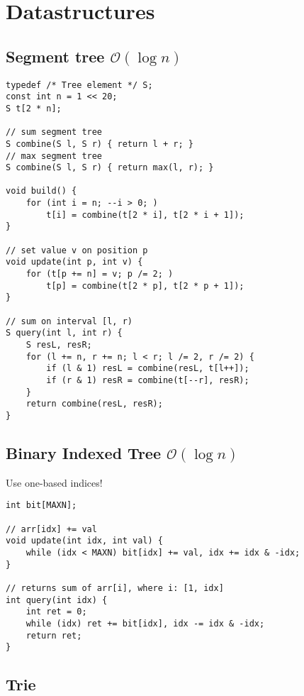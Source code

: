 \documentclass{article}
\begin{document}
\section{Datastructures}
\subsection{Segment tree $\mathcal{O}(\log n)$}

\begin{lstlisting}
typedef /* Tree element */ S;
const int n = 1 << 20;
S t[2 * n];

// sum segment tree
S combine(S l, S r) { return l + r; }
// max segment tree
S combine(S l, S r) { return max(l, r); }

void build() {
	for (int i = n; --i > 0; )
		t[i] = combine(t[2 * i], t[2 * i + 1]);
}

// set value v on position p
void update(int p, int v) {
	for (t[p += n] = v; p /= 2; )
		t[p] = combine(t[2 * p], t[2 * p + 1]);
}

// sum on interval [l, r)
S query(int l, int r) {
	S resL, resR;
	for (l += n, r += n; l < r; l /= 2, r /= 2) {
		if (l & 1) resL = combine(resL, t[l++]);
		if (r & 1) resR = combine(t[--r], resR);
	}
	return combine(resL, resR);
}

\end{lstlisting}

\subsection{Binary Indexed Tree $\mathcal{O}(\log n)$}

Use one-based indices!

\begin{lstlisting}
int bit[MAXN];

// arr[idx] += val
void update(int idx, int val) {
	while (idx < MAXN) bit[idx] += val, idx += idx & -idx;
}

// returns sum of arr[i], where i: [1, idx]
int query(int idx) {
	int ret = 0;
	while (idx) ret += bit[idx], idx -= idx & -idx;
	return ret;
}

\end{lstlisting}

\subsection{Trie}
\end{document}
